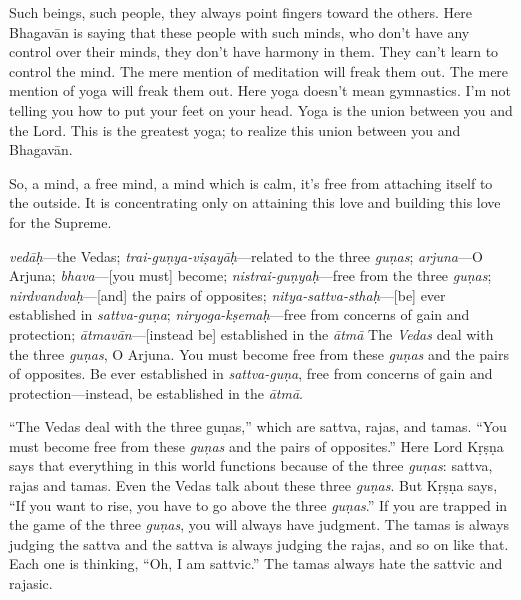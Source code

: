 Such beings, such people, they always point fingers toward the others. Here Bhagavān is saying that these people with such minds, who don’t have any control over their minds, they don’t have harmony in them. They can’t learn to control the mind. The mere mention of meditation will freak them out. The mere mention of yoga will freak them out. Here yoga doesn’t mean gymnastics. I’m not telling you how to put your feet on your head. Yoga is the union between you and the Lord. This is the greatest yoga; to realize this union between you and Bhagavān.

So, a mind, a free mind, a mind which is calm, it’s free from attaching itself to the outside. It is concentrating only on attaining this love and building this love for the Supreme.

{%
  \textit{vedāḥ}---the Vedas; 
  \textit{trai-guṇya-viṣayāḥ}---related to the three \textit{guṇas}; 
  \textit{arjuna}---O Arjuna; 
  \textit{bhava}---[you must] become; 
  \textit{nistrai-guṇyaḥ}---free from the three \textit{guṇas}; 
  \textit{nirdvandvaḥ}---[and] the pairs of opposites; 
  \textit{nitya-sattva-sthaḥ}---[be] ever established in \textit{sattva-guṇa}; 
  \textit{niryoga-kṣemaḥ}---free from concerns of gain and protection; 
  \textit{ātmavān}---[instead be] established in the \textit{ātmā}
}
{%
  The \textit{Vedas} deal with the three \textit{guṇas}, O Arjuna. You must become free from these \textit{guṇas} and the pairs of opposites. Be ever established in \textit{sattva-guṇa}, free from concerns of gain and protection—instead, be established in the \textit{ātmā}.
}

“The Vedas deal with the three guṇas,” which are sattva, rajas, and tamas. “You must become free from these \textit{guṇas} and the pairs of opposites.” Here Lord Kṛṣṇa says that everything in this world functions because of the three \textit{guṇas}: sattva, rajas and tamas. Even the Vedas talk about these three \textit{guṇas}. But Kṛṣṇa says, “If you want to rise, you have to go above the three \textit{guṇas}.” If you are trapped in the game of the three \textit{guṇas}, you will always have judgment. The tamas is always judging the sattva and the sattva is always judging the rajas, and so on like that. Each one is thinking, “Oh, I am sattvic.” The tamas always hate the sattvic and rajasic.

